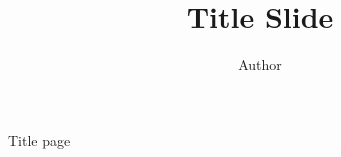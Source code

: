 \documentclass{beamer}
\title{Title Slide}
\author{Author}
\begin{document}
\begin{frame}[plain]
    \maketitle
\end{frame}

\begin{frame}{Title page}

\end{frame}
\end{document}
